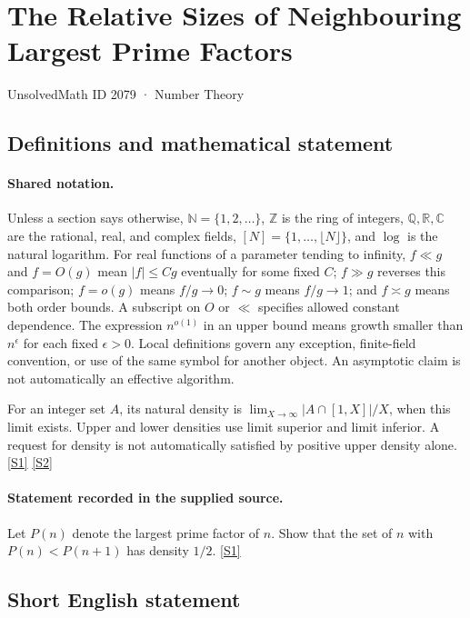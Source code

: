\documentclass[11pt,a4paper]{article}
\newcommand{\N}{\mathbb{N}}
\newcommand{\Z}{\mathbb{Z}}
\newcommand{\Q}{\mathbb{Q}}
\newcommand{\R}{\mathbb{R}}
\newcommand{\C}{\mathbb{C}}
\newcommand{\sref}[2]{\hyperlink{source:#1:#2}{[S#2]}}
\begin{document}

\setcounter{section}{2078}

\section{The Relative Sizes of Neighbouring Largest Prime Factors}\label{2079}

{\small\sffamily UnsolvedMath ID 2079 · Number Theory}

\subsection{Definitions and mathematical statement}

\paragraph{Shared notation.}Unless a section says otherwise, $\N=\{1,2,\ldots\}$,
$\Z$ is the ring of integers, $\Q,\R,\C$ are the rational, real, and complex
fields, $[N]=\{1,\ldots,\lfloor N\rfloor\}$, and $\log$ is the natural
logarithm. For real functions of a parameter tending to infinity,
$f\ll g$ and $f=O(g)$ mean $|f|\leq Cg$ eventually for some fixed $C$;
$f\gg g$ reverses this comparison; $f=o(g)$ means $f/g\to0$;
$f\sim g$ means $f/g\to1$; and $f\asymp g$ means both order bounds.
A subscript on $O$ or $\ll$ specifies allowed constant dependence.
The expression $n^{o(1)}$ in an upper bound means growth smaller than
$n^\epsilon$ for each fixed $\epsilon>0$. Local definitions govern any
exception, finite-field convention, or use of the same symbol for another
object. An asymptotic claim is not automatically an effective algorithm.



For an integer set $A$, its natural density is $\lim_{X\to\infty}|A\cap[1,X]|/X$, when this limit exists. Upper and lower densities use limit superior and limit inferior. A request for density is not automatically satisfied by positive upper density alone. \sref{2079}{1} \sref{2079}{2}

\paragraph{Statement recorded in the supplied source.}
Let $P(n)$ denote the largest prime factor of $n$. Show that the set of $n$ with $P(n)<P(n+1)$ has density $1/2$. \sref{2079}{1}

\subsection{Short English statement}
\end{document}
